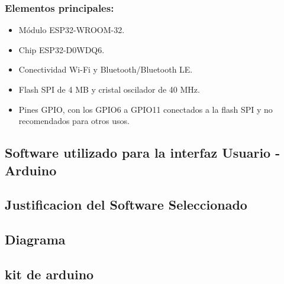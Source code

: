 \documentclass[a4paper,12pt]{article}
\begin{document}
	\subsubsection{Elementos principales:}
	\begin{itemize}
		\item Módulo ESP32-WROOM-32.
		
		\item Chip ESP32-D0WDQ6.
		
		\item Conectividad Wi-Fi y Bluetooth/Bluetooth LE.
		
		\item Flash SPI de 4 MB y cristal oscilador de 40 MHz.
		
		\item Pines GPIO, con los GPIO6 a GPIO11 conectados a la flash SPI y no recomendados para otros usos.
		
		
	\end{itemize}
	
	\subsection{Software utilizado para la interfaz Usuario - Arduino}
	
	\subsection{Justificacion del Software Seleccionado}
	\subsection{Diagrama}
	\subsection{kit de arduino}
\end{document}
